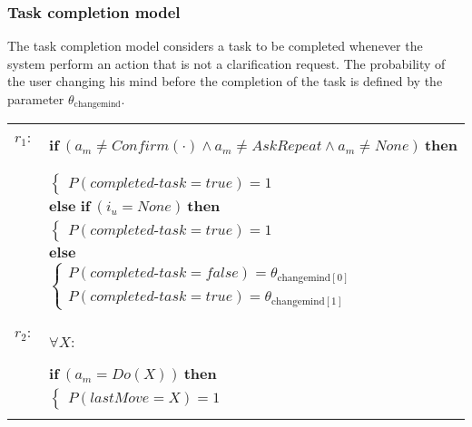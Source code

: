 \subsubsection*{Task completion model}

The task completion model considers a task to be completed whenever the system perform an action that is not a clarification request. The probability of the user changing his mind before the completion of the task is defined by the parameter $\theta_{\mathrm{changemind}}$. 

\begin{footnotesize}
\begin{longtable}{p{2cm}l}
$r_{1}$: \ \ & $ \textbf{if} \ (\mathit{a_m}\!\neq\!\mathit{Confirm(\cdot)} \land \mathit{a_m}\!\neq\!\mathit{AskRepeat} \land \mathit{a_m}\!\neq\!\mathit{None}) \ \textbf{then} $ \\
 & \;\;\;\;\; $ \begin{cases}P(\mathit{completed\mbox{-}task}\!=\!\mathit{true})\!=\!1 \end{cases}$ \vspace{1mm} \\ & $ \textbf{else if} \ (\mathit{i_u}\!=\!\mathit{None}) \ \textbf{then}$ \\
& \;\;\;\;\; $ \begin{cases}P(\mathit{completed\mbox{-}task}\!=\!\mathit{true})\!=\!1 \end{cases}$ \vspace{1mm} \\ & $ \textbf{else}$ \\
& \;\;\;\;\; $ \begin{cases}P(\mathit{completed\mbox{-}task}\!=\!\mathit{false})\!=\!\theta_{\mathrm{changemind[0]}} \\
P(\mathit{completed\mbox{-}task}\!=\!\mathit{true})\!=\!\theta_{\mathrm{changemind[1]}} \end{cases}$ \\ \\[-1mm]
$r_{2}$: \ \ & $ \forall X : $ \\ & $ \textbf{if} \ (\mathit{a_m}\!=\!\mathit{Do(X)}) \ \textbf{then} $ \\
 & \;\;\;\;\; $ \begin{cases}P(\mathit{lastMove}\!=\!\mathit{X})\!=\!1 \end{cases}$ \\ \\[-1mm]
\end{longtable}
\end{footnotesize}

